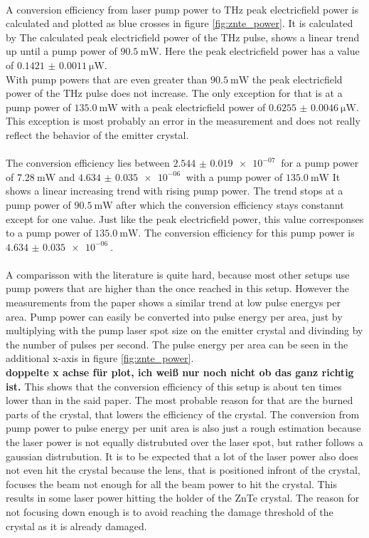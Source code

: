 \\
A conversion efficiency from laser pump power to $\si{\tera\hertz}$ peak electricfield power is calculated and plotted as blue crosses in figure \ref{fig:znte_power}.
It is calculated by 
The calculated peak electricfield power of the $\si{\tera\hertz}$ pulse, shows a linear trend up until a pump power of $\SI{90.5}{\milli\W}$.
Here the peak electricfield power has a value of $\SI{0.1421(11)}{\micro\W}$.
\\
With pump powers that are even greater than $\SI{90.5}{\milli\W}$ the peak electricfield power of the $\si{\tera\hertz}$ pulse does not increase.
The only exception for that is at a pump power of $\SI{135.0}{\milli\W}$ with a peak electricfield power of $\SI{0.6255(46)}{\micro\W}$.
This exception is most probably an error in the measurement and does not really reflect the behavior of the emitter crystal.
\\\\
The conversion efficiency lies between $\SI{2.544(19)e-07}{}$ for a pump power of $\SI{7.28}{\milli\W}$ and $\SI{4.634(35)e-06}{}$ with a pump power of $\SI{135.0}{\milli\W}$
It shows a linear increasing trend with rising pump power.
The trend stops at a pump power of $\SI{90.5}{\milli\W}$ after which the conversion efficiency stays constannt except for one value.
Just like the peak electricfield power, this value corresponses to a pump power of $\SI{135.0}{\milli\W}$.
The conversion efficiency for this pump power is $\SI{4.634(35)e-06}{}$.
\\\\
A comparisson with the literature is quite hard, because most other setups use pump powers that are higher than the once reached in this setup.
However the measurements from the paper \cite[5]{THZ_eltric_field} shows a similar trend at low pulse energys per area.
Pump power can easily be converted into pulse energy per area, just by multiplying with the pump laser spot size on the emitter crystal and divinding by the number of pulses per second.
The pulse energy per area can be seen in the additional x-axis in figure \ref{fig:znte_power}.
\\
\textbf{doppelte x achse für plot, ich weiß nur noch nicht ob das ganz richtig ist.}  
This shows that the conversion efficiency of this setup is about ten times lower than in the said paper.
The most probable reason for that are the burned parts of the crystal, that lowers the efficiency of the crystal.
The conversion from pump power to pulse energy per unit area is also just a rough estimation because the laser power is not equally distrubuted over the laser spot, but rather follows a gaussian distrubution.
It is to be expected that a lot of the laser power also does not even hit the crystal because the lens, that is positioned infront of the crystal, focuses the beam not enough for all the beam power to hit the crystal.
This results in some laser power hitting the holder of the ZnTe crystal.
The reason for not focusing down enough is to avoid reaching the damage threshold of the crystal as it is already damaged.
\FloatBarrier
